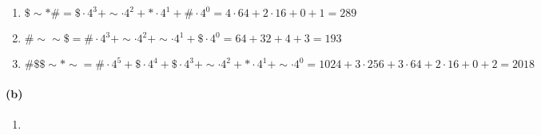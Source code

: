 \documentclass[a4paper]{article}
\begin{document}
\begin{enumerate}
	\item $ \$ \sim *\# = \$\cdot 4^3 + \sim\cdot4^2 + *\cdot 4^1 + \#\cdot4^0 = 4\cdot 64 + 2\cdot 16 + 0 + 1 = 289$ 
	\item $ \#\sim\sim\$ = \#\cdot4^3 + \sim\cdot4^2 + \sim\cdot4^1 + \$\cdot4^0 = 64 + 32 + 4 + 3 = 193$
	\item $ \#\$\$\sim * \sim = \#\cdot4^5 + \$\cdot 4^4 + \$\cdot 4^3 + \sim\cdot4^2 + *\cdot4^1 + \sim\cdot4^0 =1024 + 3\cdot256 + 3\cdot 64 + 2\cdot 16 + 0 + 2 = 2018  $	
\end{enumerate}

\paragraph{(b)}

\begin{enumerate}
	\item 
\end{enumerate}


      
\end{document}
